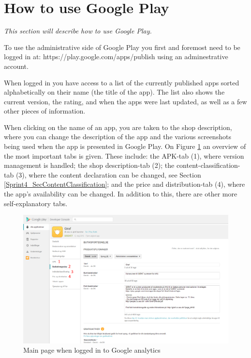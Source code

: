 \section{How to use Google Play} \label{Sprint4_SecHowToUseGooglePlay}
\textit{This section will describe how to use Google Play.}

To use the administrative side of Google Play you first and foremost need to be logged in at: https://play.google.com/apps/publish using an adminestrative account.

When logged in you have access to a list of the currently published apps sorted alphabetically on their name (the title of the app). The list also shows the current version, the rating, and when the apps were last updated, as well as a few other pieces of information.

When clicking on the name of an app, you are taken to the shop description, where you can change the description of the app and the various screenshots being used when the app is presented in Google Play. On Figure \ref{OverviewGooglePlay} an overview of the most important tabs is given. These include: the APK-tab (1), where version management is handled; the shop description-tab (2); the content-classification-tab (3), where the content declaration can be changed, see Section \ref{Sprint4_SecContentClassification}; and the price and distribution-tab (4), where the app’s availability can be changed. In addition to this, there are other more self-explanatory tabs.

\begin{figure}[H]
	\centering
	\includegraphics[width=0.8 \textwidth]{pictures/OverviewGooglePlay.png}
	\caption{Main page when logged in to Google analytics}
	\label{OverviewGooglePlay}
\end{figure}

